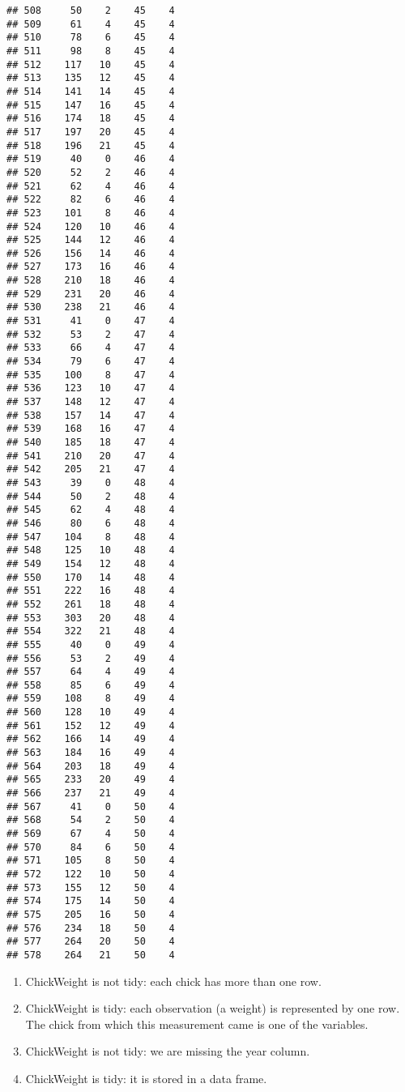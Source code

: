 \documentclass[
]{article}
\providecommand{\tightlist}{%
  \setlength{\itemsep}{0pt}\setlength{\parskip}{0pt}}
\begin{document}
\begin{verbatim}
## 508     50    2    45    4
## 509     61    4    45    4
## 510     78    6    45    4
## 511     98    8    45    4
## 512    117   10    45    4
## 513    135   12    45    4
## 514    141   14    45    4
## 515    147   16    45    4
## 516    174   18    45    4
## 517    197   20    45    4
## 518    196   21    45    4
## 519     40    0    46    4
## 520     52    2    46    4
## 521     62    4    46    4
## 522     82    6    46    4
## 523    101    8    46    4
## 524    120   10    46    4
## 525    144   12    46    4
## 526    156   14    46    4
## 527    173   16    46    4
## 528    210   18    46    4
## 529    231   20    46    4
## 530    238   21    46    4
## 531     41    0    47    4
## 532     53    2    47    4
## 533     66    4    47    4
## 534     79    6    47    4
## 535    100    8    47    4
## 536    123   10    47    4
## 537    148   12    47    4
## 538    157   14    47    4
## 539    168   16    47    4
## 540    185   18    47    4
## 541    210   20    47    4
## 542    205   21    47    4
## 543     39    0    48    4
## 544     50    2    48    4
## 545     62    4    48    4
## 546     80    6    48    4
## 547    104    8    48    4
## 548    125   10    48    4
## 549    154   12    48    4
## 550    170   14    48    4
## 551    222   16    48    4
## 552    261   18    48    4
## 553    303   20    48    4
## 554    322   21    48    4
## 555     40    0    49    4
## 556     53    2    49    4
## 557     64    4    49    4
## 558     85    6    49    4
## 559    108    8    49    4
## 560    128   10    49    4
## 561    152   12    49    4
## 562    166   14    49    4
## 563    184   16    49    4
## 564    203   18    49    4
## 565    233   20    49    4
## 566    237   21    49    4
## 567     41    0    50    4
## 568     54    2    50    4
## 569     67    4    50    4
## 570     84    6    50    4
## 571    105    8    50    4
## 572    122   10    50    4
## 573    155   12    50    4
## 574    175   14    50    4
## 575    205   16    50    4
## 576    234   18    50    4
## 577    264   20    50    4
## 578    264   21    50    4
\end{verbatim}

\begin{enumerate}
\def\labelenumi{\alph{enumi}.}
\tightlist
\item
  ChickWeight is not tidy: each chick has more than one row.
\item
  ChickWeight is tidy: each observation (a weight) is represented by one
  row. The chick from which this measurement came is one of the
  variables.
\item
  ChickWeight is not tidy: we are missing the year column.
\item
  ChickWeight is tidy: it is stored in a data frame.
\end{enumerate}
\end{document}

